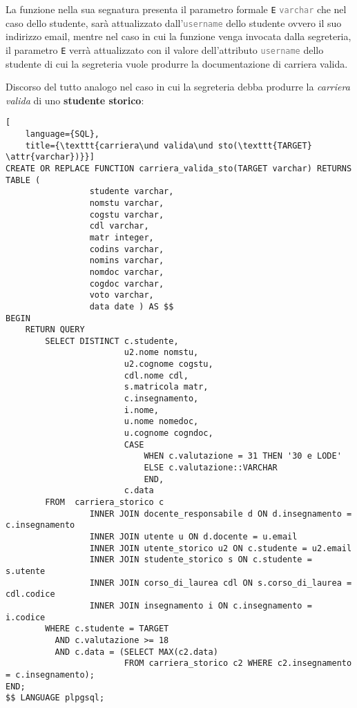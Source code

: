 \documentclass{article}
\newcommand{\attr}[1]{\texttt{\textcolor{gray}{#1}}}
\newcommand{\und}[0]{\textunderscore}
\begin{document}
La funzione nella sua segnatura presenta il parametro formale \texttt{E} \attr{varchar} che nel caso dello studente, sarà attualizzato dall'\attr{username} dello studente ovvero il suo indirizzo email, mentre nel caso in cui la funzione venga invocata dalla segreteria, il parametro \texttt{E} verrà attualizzato con il valore dell'attributo \attr{username} dello studente di cui la segreteria vuole produrre la documentazione di carriera valida.


Discorso del tutto analogo nel caso in cui la segreteria debba produrre la \textit{carriera valida} di uno \textbf{studente storico}:

\begin{lstlisting}[
    language={SQL},
    title={\texttt{carriera\und valida\und sto(\texttt{TARGET} \attr{varchar})}}]
CREATE OR REPLACE FUNCTION carriera_valida_sto(TARGET varchar) RETURNS TABLE (
                 studente varchar,
                 nomstu varchar,
                 cogstu varchar,
                 cdl varchar,
                 matr integer,
                 codins varchar,
                 nomins varchar,
                 nomdoc varchar,
                 cogdoc varchar,
                 voto varchar,
                 data date ) AS $$
BEGIN
    RETURN QUERY
        SELECT DISTINCT c.studente,
                        u2.nome nomstu,
                        u2.cognome cogstu,
                        cdl.nome cdl,
                        s.matricola matr,
                        c.insegnamento,
                        i.nome,
                        u.nome nomedoc,
                        u.cognome cogndoc,
                        CASE
                            WHEN c.valutazione = 31 THEN '30 e LODE'
                            ELSE c.valutazione::VARCHAR
                            END,
                        c.data
        FROM  carriera_storico c
                 INNER JOIN docente_responsabile d ON d.insegnamento = c.insegnamento
                 INNER JOIN utente u ON d.docente = u.email
                 INNER JOIN utente_storico u2 ON c.studente = u2.email
                 INNER JOIN studente_storico s ON c.studente = s.utente
                 INNER JOIN corso_di_laurea cdl ON s.corso_di_laurea = cdl.codice
                 INNER JOIN insegnamento i ON c.insegnamento = i.codice
        WHERE c.studente = TARGET
          AND c.valutazione >= 18
          AND c.data = (SELECT MAX(c2.data)
                        FROM carriera_storico c2 WHERE c2.insegnamento = c.insegnamento);
END;
$$ LANGUAGE plpgsql;
\end{lstlisting}
\end{document}
